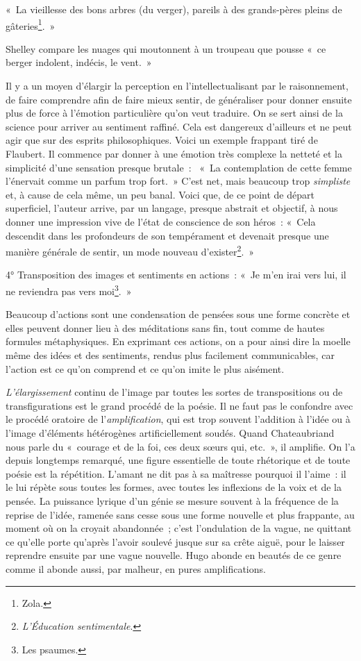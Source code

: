 \documentclass[french,twoside]{book} %
\begin{document}
\noindent « La vieillesse des bons arbres (du verger), pareils à des grands-pères pleins de gâteries\footnote{Zola.}. »\par
Shelley compare les nuages qui moutonnent à un troupeau que pousse « ce berger indolent, indécis, le vent. »\par
Il y a un moyen d’élargir la perception en l’intellectualisant par le raisonnement, de faire comprendre afin de faire mieux sentir, de généraliser pour donner ensuite plus de force à l’émotion particulière qu’on veut traduire. On se sert ainsi de la science pour arriver au sentiment raffiné. Cela est dangereux d’ailleurs et ne peut agir que sur des esprits philosophiques. Voici un exemple frappant tiré de Flaubert. Il commence par donner à une émotion très complexe la netteté et la simplicité d’une sensation presque brutale :  « La contemplation de cette femme l’énervait comme un parfum trop fort. » C’est net, mais beaucoup trop \emph{simpliste} et, à cause de cela même, un peu banal. Voici que, de ce point de départ superficiel, l’auteur arrive, par un langage, presque abstrait et objectif, à nous donner une impression vive de l’état de conscience de son héros : « Cela descendit dans les profondeurs de son tempérament et devenait presque une manière générale de sentir, un mode nouveau d’exister\footnote{\emph{L’Éducation sentimentale}.}. »\par
4° Transposition des images et sentiments en actions : « Je m’en irai vers lui, il ne reviendra pas vers moi\footnote{Les psaumes.}. »\par
Beaucoup d’actions sont une condensation de pensées sous une forme concrète et elles peuvent donner lieu à des méditations sans fin, tout comme de hautes formules métaphysiques. En exprimant ces actions, on a pour ainsi dire la moelle même des idées et des sentiments, rendus plus facilement communicables, car l’action est ce qu’on comprend et ce qu’on imite le plus aisément.\par
\emph{L’élargissement} continu de l’image par toutes les sortes de transpositions ou de transfigurations est le grand procédé de la poésie. Il ne faut pas le confondre avec le procédé oratoire de l’\emph{amplification}, qui est trop souvent l’addition à l’idée ou à l’image d’éléments hétérogènes artificiellement soudés. Quand Chateaubriand nous parle du « courage et de la foi, ces deux sœurs qui, etc. », il amplifie. On l’a depuis longtemps remarqué, une figure essentielle de toute rhétorique et de toute poésie est la répétition. L’amant ne dit pas à sa maîtresse pourquoi il l’aime : il le lui répète sous toutes les formes, avec toutes les inflexions de la voix et de la pensée. La puissance lyrique d’un génie se mesure souvent à la fréquence de la reprise de l’idée, ramenée sans cesse sous une forme nouvelle et plus frappante, au moment où on la croyait abandonnée ; c’est l’ondulation de la vague, ne quittant ce qu’elle porte qu’après l’avoir soulevé jusque sur sa crête aiguë, pour le laisser reprendre ensuite par une vague nouvelle. Hugo abonde en beautés de ce genre comme il abonde aussi, par malheur, en pures amplifications.
\end{document}
